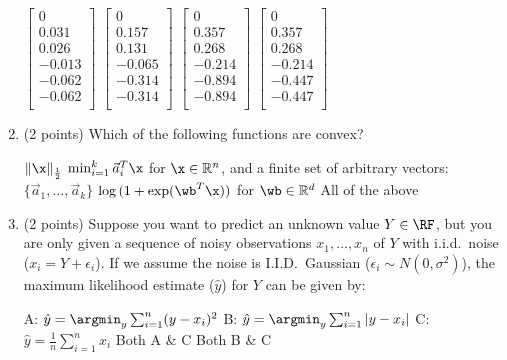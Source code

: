 \begin{enumerate}[start]
\begin{oneparcheckboxes}
	\choice 
	$\begin{bmatrix}
		0 \\
		0.031 \\
		0.026 \\
		-0.013 \\
		-0.062 \\
		-0.062 \\
	\end{bmatrix}$
 \choice $\begin{bmatrix}
	0 \\
	0.157 \\
	0.131 \\
	-0.065 \\
	-0.314 \\
	-0.314 \\
	\end{bmatrix}$
	\choice $\begin{bmatrix}
	0 \\
	0.357 \\
	0.268 \\
	-0.214 \\
	-0.894 \\
	-0.894 \\
	\end{bmatrix}$
	\choice $\begin{bmatrix}
	0 \\
	0.357 \\
	0.268 \\
	-0.214 \\
	-0.447 \\
	-0.447 \\
	\end{bmatrix}$
\end{oneparcheckboxes}

\item (2 points) Which of the following functions are convex?
\begin{checkboxes}
\choice $\|\x\|_{\frac{1}{2}}$ 
\choice $\min_{i=1}^k \vec{a}_{i}^T \x$ for $\x \in \mathbb{R}^n$, and a finite set of arbitrary vectors: $\{\vec{a}_1, \dots, \vec{a}_k\}$
\choice $\log{(1+\exp(\wb^T \x))} $ for $\wb \in \mathbb{R}^d$
\choice All of the above
\end{checkboxes}


\item (2 points) Suppose you want to predict an unknown value $Y \in \RF$, but you are only given
a sequence of noisy observations $x_1, \dots, x_n$ of $Y$ with i.i.d.\ noise ($x_i = Y + \epsilon_i $). If we assume the noise is I.I.D.\ Gaussian ($\epsilon_i \sim N(0, \sigma^2)$), the maximum likelihood
estimate ($\hat y$) for $Y$ can be given by: 


\begin{checkboxes}
	\choice A: $ \hat y = \argmin_y \sum_{i=1}^{n} (y - x_i)^2 $ 
	\choice B: $ \hat y = \argmin_y \sum_{i=1}^{n} |y - x_i| $
	\choice C: $\hat y = \frac{1}{n} \sum_{i=1}^{n} x_i $
	\choice Both A \&  C
	\choice Both B \& C
	
\end{checkboxes}
\end{enumerate}
\pagebreak
